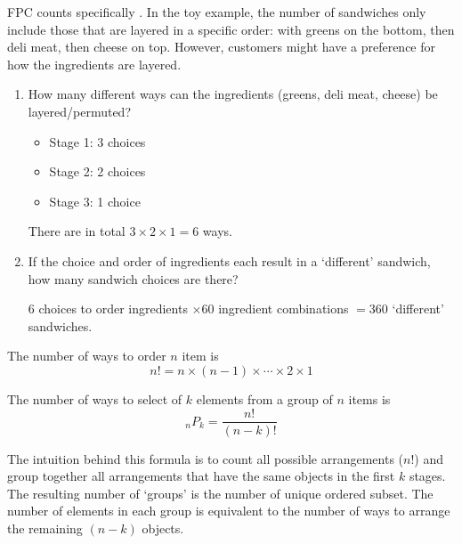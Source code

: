 \begin{example}
    FPC counts specifically . In the toy example, the number of sandwiches only include those that are layered in a specific order: with greens on the bottom, then deli meat, then cheese on top. However, customers might have a preference for how the ingredients are layered. 

    \begin{enumerate}[label=\alph*)]
        \item How many different ways can the ingredients (greens, deli meat, cheese) be layered/permuted?

        \begin{itemize}
            \item Stage 1: 3 choices
            \item Stage 2: 2 choices
            \item Stage 3: 1 choice
        \end{itemize}

        There are in total $3 \times 2 \times 1 = 6$ ways. 

        \item If the choice and order of ingredients each result in a `different' sandwich, how many sandwich choices are there?
        
        $6$ choices to order ingredients $\times 60$ ingredient combinations $= 360$ `different' sandwiches. 
    \end{enumerate}
\end{example}

\begin{definition}[Permutation - $_nP_n$]
    The number of ways to order $n$  item is $$n! = n \times (n - 1) \times \cdots \times 2 \times 1$$
\end{definition}

\begin{definition}[Permutation - $_nP_k$]
    The number of ways to select  of $k$ elements from a group of $n$  items is $$_nP_k = \frac{n!}{(n-k)!}$$
\end{definition}

The intuition behind this formula is to count all possible arrangements ($n!$) and group together all arrangements that have the same objects in the first $k$ stages. The resulting number of `groups' is the number of unique ordered subset. The number of elements in each group is equivalent to the number of ways to arrange the remaining $(n - k)$ objects. 